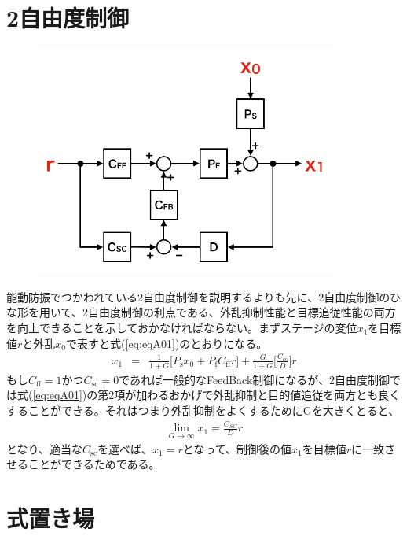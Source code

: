 \documentclass[a4paper,12pt]{jsarticle}
\begin{document}
\appendix
\section{2自由度制御}

\begin{figure}[H]
  \begin{center}
    \includegraphics[width=10.0cm]{./img_2dof.png}
  \end{center}
  \caption{}\label{img:img_2dof}
\end{figure}

能動防振でつかわれている2自由度制御を説明するよりも先に、2自由度制御のひな形を用いて、2自由度制御の利点である、外乱抑制性能と目標追従性能の両方を向上できることを示しておかなければならない。まずステージの変位$x_1$を目標値$r$と外乱$x_0$で表すと式(\ref{eq:eqA01})のとおりになる。
\begin{eqnarray} \label{eq:eqA01}
  x_1 &=& \frac{1}{1+G}\Biggl[P_{\mathrm{s}}x_0 + P_{\mathrm{f}}C_{\mathrm{ff}}r\Biggl] + \frac{G}{1+G}\Biggl[\frac{C_{\mathrm{sc}}}{D}\Biggl]r
\end{eqnarray}
もし$C_{\mathrm{ff}}=1$かつ$C_{\mathrm{sc}}=0$であれば一般的なFeedBack制御になるが、2自由度制御では式(\ref{eq:eqA01})の第2項が加わるおかげで外乱抑制と目的値追従を両方とも良くすることができる。それはつまり外乱抑制をよくするためにGを大きくとると、
\begin{eqnarray} \label{eq:eqA02}
  \lim_{G \to \infty} x_1 = \frac{C_{SC}}{D}r
\end{eqnarray}
となり、適当な$C_{\mathrm{sc}}$を選べば、$x_{1}=r$となって、制御後の値$x_{1}$を目標値$r$に一致させることができるためである。

\section{式置き場}
\end{document}
